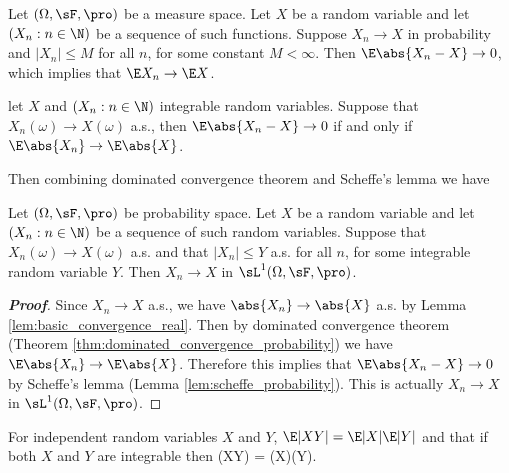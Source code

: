 \begin{theorem}\label{thm:bounded_convergence_probability}
Let $(\Omega,\sF,\pro)$ be a measure space. Let $X$ be a random variable and let $(X_n : n \in \N)$ be a sequence of such functions. Suppose $X_n \to X$ in probability and $|X_n| \leq M$ for all $n$, for some constant $M < \infty$. Then $\E\abs{X_n - X}\to 0$, which implies that $\E X_n\to \E X$.
\end{theorem}

\begin{lemma}\label{lem:scheffe_probability}
let $X$ and $(X_n : n \in \N)$ integrable random variables. Suppose that $X_n(\omega) \to X(\omega)$ a.s., then $\E\abs{X_n -X} \to 0$ if and only if $\E\abs{X_n} \to \E\abs{X}$.
\end{lemma}


Then combining dominated convergence theorem and Scheffe's lemma we have
\begin{corollary}
Let $(\Omega,\sF,\pro)$ be probability space. Let $X$ be a random variable and let $(X_n : n \in \N)$ be a sequence of such random variables. Suppose that $X_n(\omega) \to X(\omega)$ a.s. and that $|X_n| \leq Y$ a.s. for all $n$, for some integrable random variable $Y$. Then $X_n\to X$ in $\sL^1(\Omega,\sF,\pro)$.
\end{corollary}

\begin{proof}[\bf Proof]
Since $X_n\to X$ a.s., we have $\abs{X_n}\to \abs{X}$ a.s. by Lemma \ref{lem:basic_convergence_real}. Then by dominated convergence theorem (Theorem \ref{thm:dominated_convergence_probability}) we have $\E\abs{X_n} \to \E\abs{X}$. Therefore this implies that $\E\abs{X_n -X} \to 0$ by Scheffe's lemma (Lemma \ref{lem:scheffe_probability}). This is actually $X_n \to X$ in $\sL^1(\Omega,\sF,\pro)$.
\end{proof}


\begin{proposition}\label{pro:expectation_of_independent_product}
For independent random variables $X$ and $Y$, $\E|XY| = \E|X|\E|Y|$ and that if both $X$ and $Y$ are integrable then
\be
\E(XY) = \E(X)\E(Y).
\ee
\end{proposition}

